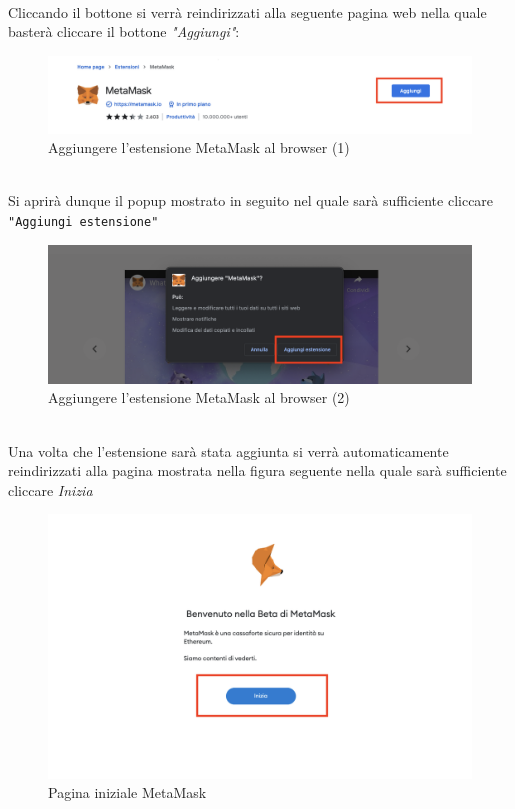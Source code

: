 \textbf{}\\
Cliccando il bottone si verrà reindirizzati alla seguente pagina web nella quale basterà cliccare il bottone \textit{"Aggiungi"}:
\begin{figure}[H]
    \centering
    \includegraphics[scale=0.3]{immagini/MetaMAsk/MetaMaskExtensionPage.png}
    \caption{Aggiungere l'estensione MetaMask al browser (1)}
\end{figure}
\textbf{}\\
Si aprirà dunque il popup mostrato in seguito nel quale sarà sufficiente cliccare \texttt{"Aggiungi estensione"}
\begin{figure}[H]
    \centering
    \includegraphics[scale=0.3]{immagini/MetaMAsk/AddExtenction.png}
    \caption{Aggiungere l'estensione MetaMask al browser (2)}
\end{figure}
\textbf{}\\
Una volta che l'estensione sarà stata aggiunta si verrà automaticamente reindirizzati alla pagina mostrata nella figura seguente nella quale sarà sufficiente cliccare \textit{Inizia}
\begin{figure}[H]
    \centering
    \includegraphics[scale=0.3]{immagini/MetaMask/startMetamask.png}
    \caption{Pagina iniziale MetaMask}
\end{figure}

